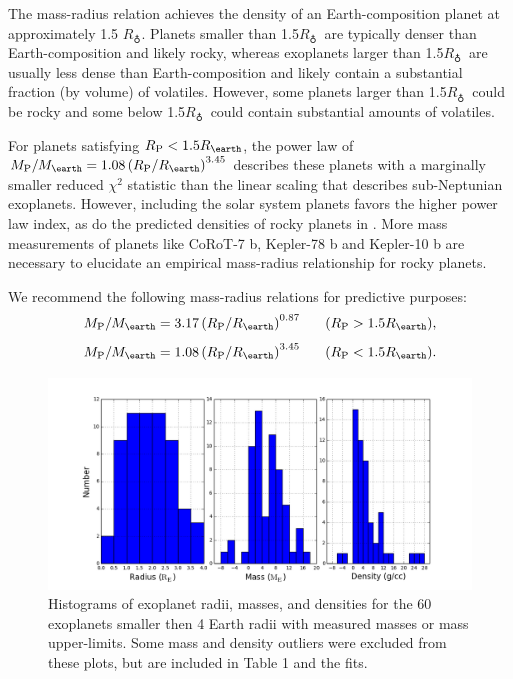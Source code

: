 \documentclass[iop]{emulateapj}
\newcommand{\rpl}{\ensuremath{R_{\rm P}}}
\newcommand{\mpl}{\ensuremath{M_{\rm P}}}
\newcommand{\rearth}{\ensuremath{R_\earth}}
\newcommand{\mearth}{\ensuremath{M_\earth}}
\begin{document}
The mass-radius relation achieves the density of an Earth-composition planet at approximately 1.5 \rearth.   Planets smaller than 1.5\rearth\ are typically denser than Earth-composition and likely rocky, whereas exoplanets larger than 1.5\rearth\ are usually less dense than Earth-composition and likely contain a substantial fraction (by volume) of volatiles.  However, some planets larger than 1.5\rearth\ could be rocky and some below 1.5\rearth\ could contain substantial amounts of volatiles.

For planets satisfying $\rpl < 1.5 \rearth$, the power law of $\mpl/\mearth = 1.08 \left(\rpl/\rearth\right)^{3.45}$ describes these planets with a marginally smaller reduced $\chi^2$ statistic than the linear scaling that describes sub-Neptunian exoplanets.  However, including the solar system planets favors the higher power law index, as do the predicted densities of rocky planets in \citet{Seager2007}.  More mass measurements of planets like CoRoT-7 b, Kepler-78 b and Kepler-10 b are necessary to elucidate an empirical mass-radius relationship for rocky planets.

We recommend the following mass-radius relations for predictive purposes:  $$\mpl/\mearth = 3.17 \left(\rpl/\rearth \right)^{0.87} ~~~~~(\rpl > 1.5\rearth),$$ $$\mpl/\mearth = 1.08 \left(\rpl/\rearth\right)^{3.45} ~~~~~(\rpl < 1.5\rearth).$$



\begin{figure}[htbp] %
   \centering
   \includegraphics[width=6in]{histograms.png} 
   \caption{\small Histograms of exoplanet radii, masses, and densities for the 60 exoplanets smaller then 4 Earth radii with measured masses or mass upper-limits.  Some mass and density outliers were excluded from these plots, but are included in Table 1 and the fits.}
\label{fig:histograms}
\end{figure}
\end{document}
